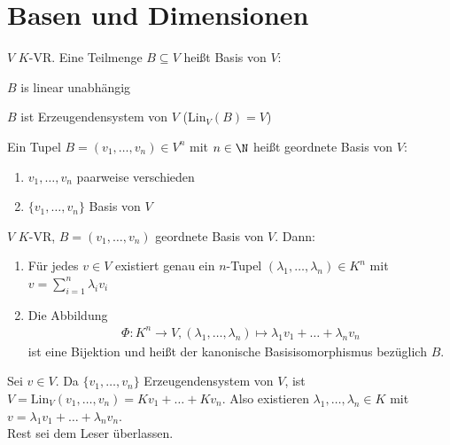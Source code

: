 \section{Basen und Dimensionen}
\begin{definition}
	$V$ $K$-VR. Eine Teilmenge $B\subseteq V$ heißt Basis von $V$:
	\begin{enumerateroman}
	\item $B$ is linear unabhängig
	\item $B$ ist Erzeugendensystem von $V$ ($\mathrm{Lin}_V(B)=V$)
	\end{enumerateroman}
	Ein Tupel $B=(v_1, \dots, v_n)\in V^n$ mit $n\in \N$ heißt geordnete Basis von $V$:
	\begin{enumerate}
		\item $v_1, \dots, v_n$ paarweise verschieden
		\item $\{v_1, \dots, v_n\}$ Basis von $V$
	\end{enumerate}
\end{definition}
\begin{theorem}
	$V$ $K$-VR, $B=(v_1,\dots, v_n)$ geordnete Basis von $V$. Dann:
	\begin{enumerate}
		\item Für jedes $v \in V$ existiert genau ein $n$-Tupel $(\lambda_1, \dots, \lambda_n)\in K^n$ mit $v=\sum\limits_{i=1}^n \lambda_iv_i$
		\item Die Abbildung \begin{align*}
			\Phi: K^n \to V, (\lambda_1,\dots, \lambda_n)\mapsto \lambda_1v_1+\dots + \lambda_nv_n
		\end{align*}
		ist eine Bijektion und heißt der kanonische Basisisomorphismus bezüglich $B$.
	\end{enumerate}
\end{theorem}
\prove Sei $v\in V$. Da $\{v_1,\dots, v_n\}$ Erzeugendensystem von $V$, ist $V=\mathrm{Lin}_V(v_1,\dots,v_n)=Kv_1+\dots+Kv_n$. Also existieren $\lambda_1,\dots, \lambda_n \in K$ mit $v=\lambda_1v_1+\dots +\lambda_nv_n$.\\
Rest sei dem Leser überlassen.
